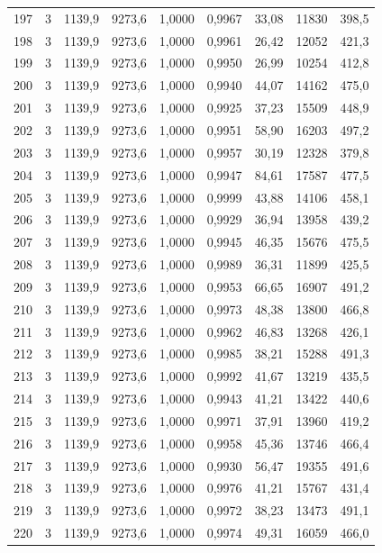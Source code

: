 \documentclass[11pt,a4paper]{article}
\begin{document}
{\begin{longtable}{r c r r r r r r r}
197 & 3 & 1139,9 & 9273,6 & 1,0000 & 0,9967 & 33,08 & 11830 & 398,5 \\
198 & 3 & 1139,9 & 9273,6 & 1,0000 & 0,9961 & 26,42 & 12052 & 421,3 \\
199 & 3 & 1139,9 & 9273,6 & 1,0000 & 0,9950 & 26,99 & 10254 & 412,8 \\
200 & 3 & 1139,9 & 9273,6 & 1,0000 & 0,9940 & 44,07 & 14162 & 475,0 \\
201 & 3 & 1139,9 & 9273,6 & 1,0000 & 0,9925 & 37,23 & 15509 & 448,9 \\
202 & 3 & 1139,9 & 9273,6 & 1,0000 & 0,9951 & 58,90 & 16203 & 497,2 \\
203 & 3 & 1139,9 & 9273,6 & 1,0000 & 0,9957 & 30,19 & 12328 & 379,8 \\
204 & 3 & 1139,9 & 9273,6 & 1,0000 & 0,9947 & 84,61 & 17587 & 477,5 \\
205 & 3 & 1139,9 & 9273,6 & 1,0000 & 0,9999 & 43,88 & 14106 & 458,1 \\
206 & 3 & 1139,9 & 9273,6 & 1,0000 & 0,9929 & 36,94 & 13958 & 439,2 \\
207 & 3 & 1139,9 & 9273,6 & 1,0000 & 0,9945 & 46,35 & 15676 & 475,5 \\
208 & 3 & 1139,9 & 9273,6 & 1,0000 & 0,9989 & 36,31 & 11899 & 425,5 \\
209 & 3 & 1139,9 & 9273,6 & 1,0000 & 0,9953 & 66,65 & 16907 & 491,2 \\
210 & 3 & 1139,9 & 9273,6 & 1,0000 & 0,9973 & 48,38 & 13800 & 466,8 \\
211 & 3 & 1139,9 & 9273,6 & 1,0000 & 0,9962 & 46,83 & 13268 & 426,1 \\
212 & 3 & 1139,9 & 9273,6 & 1,0000 & 0,9985 & 38,21 & 15288 & 491,3 \\
213 & 3 & 1139,9 & 9273,6 & 1,0000 & 0,9992 & 41,67 & 13219 & 435,5 \\
214 & 3 & 1139,9 & 9273,6 & 1,0000 & 0,9943 & 41,21 & 13422 & 440,6 \\
215 & 3 & 1139,9 & 9273,6 & 1,0000 & 0,9971 & 37,91 & 13960 & 419,2 \\
216 & 3 & 1139,9 & 9273,6 & 1,0000 & 0,9958 & 45,36 & 13746 & 466,4 \\
217 & 3 & 1139,9 & 9273,6 & 1,0000 & 0,9930 & 56,47 & 19355 & 491,6 \\
218 & 3 & 1139,9 & 9273,6 & 1,0000 & 0,9976 & 41,21 & 15767 & 431,4 \\
219 & 3 & 1139,9 & 9273,6 & 1,0000 & 0,9972 & 38,23 & 13473 & 491,1 \\
220 & 3 & 1139,9 & 9273,6 & 1,0000 & 0,9974 & 49,31 & 16059 & 466,0 \\

\end{longtable}}
\end{document}
